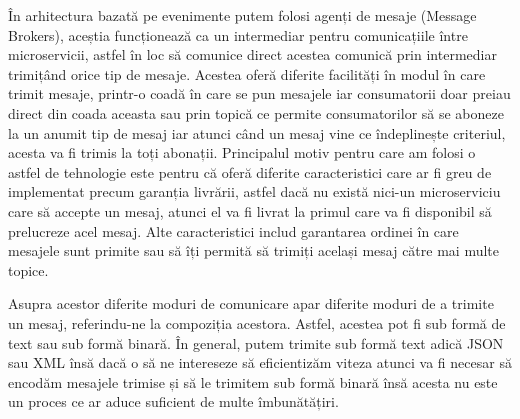 În arhitectura bazată pe evenimente putem folosi agenți de mesaje (Message Brokers), 
aceștia funcționează ca un intermediar pentru comunicațiile între microservicii, astfel în loc
să comunice direct acestea comunică prin intermediar trimițând orice tip de mesaje.
Acestea oferă diferite facilități în modul în care trimit mesaje, printr-o coadă în care
se pun mesajele iar consumatorii doar preiau direct din coada aceasta sau prin topică ce permite
consumatorilor să se aboneze la un anumit tip de mesaj iar atunci când un mesaj vine ce îndeplinește
criteriul, acesta va fi trimis la toți abonații. Principalul motiv pentru care am folosi o astfel
de tehnologie este pentru că oferă diferite caracteristici care ar fi greu de implementat
precum garanția livrării, astfel dacă nu există nici-un microserviciu care să accepte un mesaj,
atunci el va fi livrat la primul care va fi disponibil să prelucreze acel mesaj. Alte caracteristici
includ garantarea ordinei în care mesajele sunt primite sau să îți permită să trimiți același 
mesaj către mai multe topice.

Asupra acestor diferite moduri de comunicare apar diferite moduri de a trimite un mesaj, 
referindu-ne la compoziția acestora. Astfel, acestea pot fi sub formă de text sau sub formă
binară. În general, putem trimite sub formă text adică JSON sau XML însă dacă o să ne intereseze
să eficientizăm viteza atunci va fi necesar să encodăm mesajele trimise și să le trimitem sub
formă binară însă acesta nu este un proces ce ar aduce suficient de multe îmbunătățiri.

